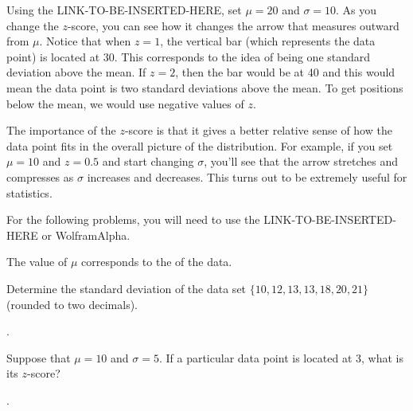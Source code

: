 \documentclass{ximera}
\begin{document}
Using the LINK-TO-BE-INSERTED-HERE, set $\mu = 20$ and $\sigma = 10$. As you change the $z$-score, you can see how it changes the arrow that measures outward from $\mu$. Notice that when $z = 1$, the vertical bar (which represents the data point) is located at 30. This corresponds to the idea of being one standard deviation above the mean. If $z = 2$, then the bar would be at 40 and this would mean the data point is two standard deviations above the mean. To get positions below the mean, we would use negative values of $z$.

The importance of the $z$-score is that it gives a better relative sense of how the data point fits in the overall picture of the distribution. For example, if you set $\mu = 10$ and $z = 0.5$ and start changing $\sigma$, you'll see that the arrow stretches and compresses as $\sigma$ increases and decreases. This turns out to be extremely useful for statistics.

For the following problems, you will need to use the LINK-TO-BE-INSERTED-HERE or WolframAlpha.

\begin{question}
The value of $\mu$ corresponds to the \underline{\hspace{30pt}} of the data.
  \begin{solution}
    \begin{multiple-choice}
    \end{multiple-choice}
  \end{solution}
\end{question}

\begin{question}
Determine the standard deviation of the data set $\{ 10, 12, 13, 13, 18, 20, 21\}$ (rounded to two decimals).
  \begin{solution}
    .
  \end{solution}
\end{question}

\begin{question}
Suppose that $\mu = 10$ and $\sigma = 5$. If a particular data point is located at 3, what is its $z$-score?
  \begin{solution}
    .
  \end{solution}
\end{question}
\end{document}
